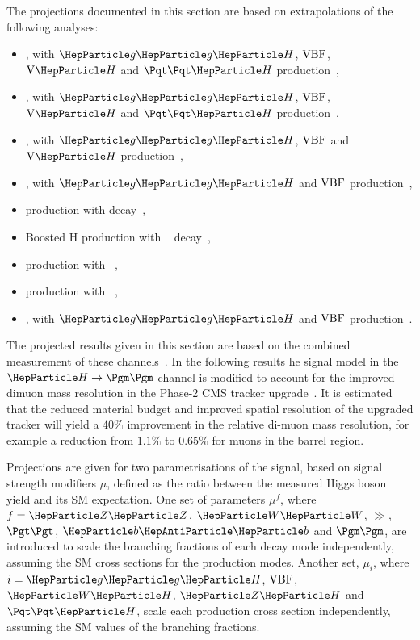 
The projections documented in this section are based on extrapolations of the following analyses:

\begin{itemize}
	\item \hgg, with $\ggh$, $\mathrm{VBF}$, $\vh$ and $\tth$ production~\cite{Sirunyan:2018ouh},
	\item \hzzllll, with $\ggh$, $\mathrm{VBF}$, $\vh$ and $\tth$ production~\cite{HIG16041},
	\item \hwwlnln, with $\ggh$, $\mathrm{VBF}$ and $\vh$ production~\cite{HIG-16-042},
	\item \htt, with $\ggh$ and $\mathrm{VBF}$ production~\cite{HIG16043},
	\item \vh production with \hbb decay~\cite{HIG16044},
	\item Boosted H production with \hbb~ decay~\cite{HIG17010},
	\item \tth production with \hlep~\cite{Sirunyan:2018shy},
	\item \tth production with \hbb~\cite{bib:hig-17-026,Sirunyan:2018ygk},
	\item \hmm, with $\ggh$ and $\mathrm{VBF}$ production~\cite{HIG-17-019}.
\end{itemize}

The projected results given in this section are based on the combined measurement of these channels~\cite{Sirunyan:2018koj}. In the following results he signal model in the $\hmm$ channel is modified to account for the improved dimuon mass resolution in the Phase-2 CMS tracker upgrade~\cite{Klein:2017nke}. It is estimated that the reduced material budget and improved spatial resolution of the upgraded tracker will yield a $40\%$ improvement in the relative di-muon mass resolution, for example a reduction from $1.1\%$ to $0.65\%$ for muons in the barrel region.


Projections are given for two parametrisations of the signal, based on signal strength modifiers $\mu$, defined as the ratio between the measured Higgs boson yield and its SM expectation. One set of parameters $\mu^{f}$, where $f = \zz$, $\ww$, $\gg$, $\tautau$, $\PQb\PAQb$ and $\mumu$, are introduced to scale the branching fractions of each decay mode independently, assuming the SM cross sections for the production modes. Another set, $\mu_{i}$, where $i=\ggh$, $\mathrm{VBF}$, $\wh$, $\zh$ and $\tth$, scale each production cross section independently, assuming the SM values of the branching fractions.

